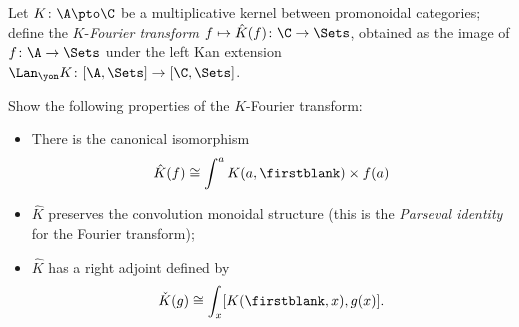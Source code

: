 \begin{definition}
Let $K\colon \A\pto\C$ be a multiplicative kernel between promonoidal categories; define the $K$-\emph{Fourier transform} $f\mapsto \hat K(f)\colon \C\to \Sets$, obtained as the image of $f\colon \A\to\Sets$ under the left Kan extension $\Lan_\yon K\colon [\A, \Sets]\to [\C, \Sets]$.
\end{definition}
\begin{exercise}
Show the following properties of the $K$-Fourier transform:
\begin{itemize}
\item There is the canonical isomorphism
\[
\hat K(f) \cong \int^a K(a,\firstblank)\times f(a)
\]
\item $\hat K$ preserves the convolution monoidal structure (this is the \emph{Parseval identity} for the Fourier transform);
\item $\hat K$ has a right adjoint defined by
\[
\check{K}(g) \cong \int_x [K(\firstblank, x), g(x)].
\]
\end{itemize}
\end{exercise}
